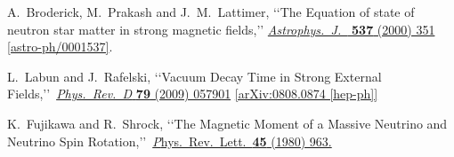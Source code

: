 \documentclass[epj]{svjour}
\begin{document}
\begin{thebibliography}{99}
 A.~Broderick, M.~Prakash and J.~M.~Lattimer,
 \lq\lq The Equation of state of neutron star matter in strong magnetic fields,\rq\rq
 \href{https://doi.org/10.1086/309010}{\emph{Astrophys.\ J.\ } {\bf 537} (2000) 351}
 \href{https://arxiv.org/abs/astro-ph/0001537}{[astro-ph/0001537]}.


 L.~Labun and J.~Rafelski,
\lq\lq Vacuum Decay Time in Strong External Fields,\rq\rq\
\href{https://doi.org/10.1103/PhysRevD.79.057901}{\emph{Phys.\ Rev.\ D} {\bf 79} (2009) 057901}
\href{https://arxiv.org/abs/0808.0874}{[arXiv:0808.0874 [hep-ph]]} 

 K.~Fujikawa and R.~Shrock,
 \lq\lq The Magnetic Moment of a Massive Neutrino and Neutrino Spin Rotation,\rq\rq\
 \href{https://doi.org/10.1103/PhysRevLett.45.963}{\emph Phys.\ Rev.\ Lett.\ {\bf 45} (1980) 963.}

\end{thebibliography}
\end{document}

